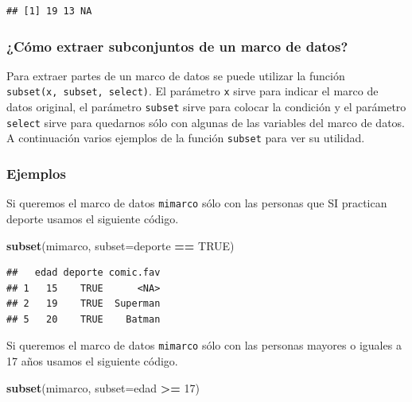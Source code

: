 \documentclass[10pt,]{krantz}
\makeatletter
\newenvironment{Shaded}{\begin{snugshade}}{\end{snugshade}}
\newcommand{\KeywordTok}[1]{\textcolor[rgb]{0.13,0.29,0.53}{\textbf{#1}}}
\newcommand{\DataTypeTok}[1]{\textcolor[rgb]{0.13,0.29,0.53}{#1}}
\newcommand{\DecValTok}[1]{\textcolor[rgb]{0.00,0.00,0.81}{#1}}
\newcommand{\StringTok}[1]{\textcolor[rgb]{0.31,0.60,0.02}{#1}}
\newcommand{\OtherTok}[1]{\textcolor[rgb]{0.56,0.35,0.01}{#1}}
\newcommand{\OperatorTok}[1]{\textcolor[rgb]{0.81,0.36,0.00}{\textbf{#1}}}
\newcommand{\NormalTok}[1]{#1}
\newenvironment{kframe}{%
\medskip{}
\setlength{\fboxsep}{.8em}
 \def\at@end@of@kframe{}%
 \ifinner\ifhmode%
  \def\at@end@of@kframe{\end{minipage}}%
  \begin{minipage}{\columnwidth}%
 \fi\fi%
 \def\FrameCommand##1{\hskip\@totalleftmargin \hskip-\fboxsep
 \colorbox{shadecolor}{##1}\hskip-\fboxsep
     \hskip-\linewidth \hskip-\@totalleftmargin \hskip\columnwidth}%
 \MakeFramed {\advance\hsize-\width
   \@totalleftmargin\z@ \linewidth\hsize
   \@setminipage}}%
 {\par\unskip\endMakeFramed%
 \at@end@of@kframe}
\renewenvironment{Shaded}{\begin{kframe}}{\end{kframe}}
\makeatother
\begin{document}
\begin{verbatim}
## [1] 19 13 NA
\end{verbatim}

\subsubsection{\texorpdfstring{¿Cómo extraer subconjuntos de un marco de
datos?
}{¿Cómo extraer subconjuntos de un marco de datos? }}\label{como-extraer-subconjuntos-de-un-marco-de-datos}

Para extraer partes de un marco de datos se puede utilizar la función
\texttt{subset(x,\ subset,\ select)}. El parámetro \texttt{x} sirve para
indicar el marco de datos original, el parámetro \texttt{subset} sirve
para colocar la condición y el parámetro \texttt{select} sirve para
quedarnos sólo con algunas de las variables del marco de datos. A
continuación varios ejemplos de la función \texttt{subset} para ver su
utilidad.

\subsubsection*{Ejemplos}\label{ejemplos}

Si queremos el marco de datos \texttt{mimarco} sólo con las personas que
SI practican deporte usamos el siguiente código.

\begin{Shaded}
\begin{Highlighting}[]
\KeywordTok{subset}\NormalTok{(mimarco, }\DataTypeTok{subset=}\NormalTok{deporte }\OperatorTok{==}\StringTok{ }\OtherTok{TRUE}\NormalTok{)}
\end{Highlighting}
\end{Shaded}

\begin{verbatim}
##   edad deporte comic.fav
## 1   15    TRUE      <NA>
## 2   19    TRUE  Superman
## 5   20    TRUE    Batman
\end{verbatim}

Si queremos el marco de datos \texttt{mimarco} sólo con las personas
mayores o iguales a 17 años usamos el siguiente código.

\begin{Shaded}
\begin{Highlighting}[]
\KeywordTok{subset}\NormalTok{(mimarco, }\DataTypeTok{subset=}\NormalTok{edad }\OperatorTok{>=}\StringTok{ }\DecValTok{17}\NormalTok{)}
\end{Highlighting}
\end{Shaded}
\end{document}
